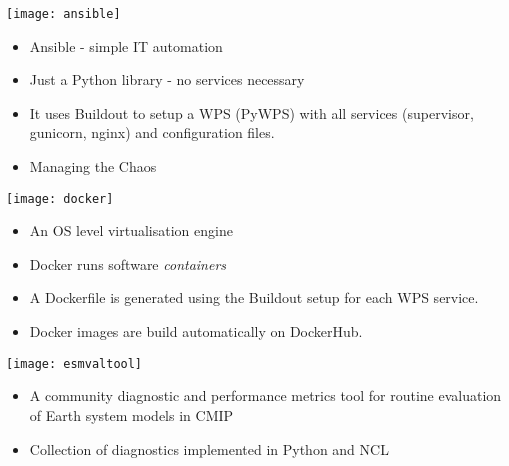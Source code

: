 \documentclass[portrait,a0paper,fontscale=0.4]{baposter} %
\newcommand{\compresslist}{%
\setlength{\itemsep}{1pt}%
\setlength{\parskip}{0pt}%
\setlength{\parsep}{0pt}%
}
\begin{document}
\begin{poster}
{\begin{multicols}{2}
\begin{minipage}{0.5\textwidth}
    \begin{minipage}{0.2\textwidth}
      \texttt{[image: ansible]}
    \end{minipage}
    \begin{minipage}{0.8\textwidth}
      \begin{itemize}\compresslist
        \item Ansible - simple IT automation
        \item Just a Python library - no services necessary
        \item It uses Buildout to setup a WPS (PyWPS) with all services (supervisor, gunicorn, nginx) and configuration files.
        \item Managing the Chaos
      \end{itemize}
    \end{minipage}

    \begin{minipage}{0.2\textwidth}
      \texttt{[image: docker]}
    \end{minipage}
    \begin{minipage}{0.8\textwidth}
      \begin{itemize}\compresslist
        \item An OS level virtualisation engine
        \item Docker runs software \textit{containers}
        \item A Dockerfile is generated using the Buildout setup for each WPS service.
        \item Docker images are build automatically on DockerHub.
      \end{itemize}
    \end{minipage}

    \begin{minipage}{0.2\textwidth}
      \texttt{[image: esmvaltool]}
    \end{minipage}
    \begin{minipage}{0.8\textwidth}
      \begin{itemize}\compresslist
        \item A community diagnostic and performance metrics tool for routine evaluation of Earth system models in CMIP
        \item Collection of diagnostics implemented in Python and NCL
      \end{itemize}
    \end{minipage}
  \end{minipage}
  \end{multicols}
}


\end{poster}
\end{document}
